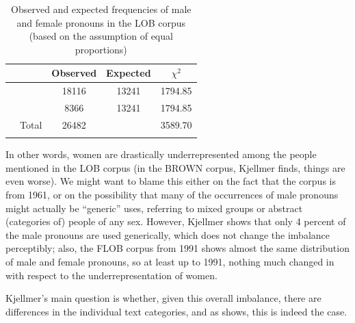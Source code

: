 \begin{table}
\caption{Observed and expected frequencies of male and female pronouns in the LOB corpus (based on the assumption of equal proportions)}
\label{tab:sexpronlob}
\begin{tabular}[t]{llS[table-format=5]S[table-format=5]S[table-format=4.2]}
\lsptoprule
 & & {Observed} & {Expected} & {$\chi^2$} \\
\midrule
{} &  &  18116 &  13241 &  1794.85 \\
                 &  &  8366 &  13241 &  1794.85 \\
\midrule
	& Total &  26482 &  &  3589.70 \\
\lspbottomrule
\end{tabular}
\end{table}

In other words, women are drastically underrepresented among the people mentioned in the LOB  corpus (in the BROWN  corpus, Kjellmer finds, things are even worse).  We might want to blame this either on the fact that the corpus is from 1961, or on the possibility that many of the occurrences of male pronouns  might actually be ``generic'' uses, referring to mixed groups or abstract (categories of) people of any sex. However, Kjellmer shows that only 4 percent of the male pronouns are used generically, which does not change the imbalance perceptibly; also, the FLOB  corpus from 1991 shows almost the same distribution  of male and female pronouns,  so at least up to 1991, nothing much changed in with respect to the underrepresentation of women.

Kjellmer's main question is whether, given this overall imbalance, there are differences in the individual text categories, and as  shows, this is indeed the case.

